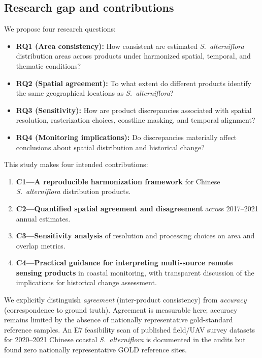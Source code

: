 \documentclass[11pt]{article}
\begin{document}
\subsection{Research gap and contributions}

We propose four research questions:

\begin{itemize}[nosep]
\item \textbf{RQ1 (Area consistency):} How consistent are estimated
  \textit{S.~alterniflora} distribution areas across products under harmonized
  spatial, temporal, and thematic conditions?
\item \textbf{RQ2 (Spatial agreement):} To what extent do different products
  identify the same geographical locations as \textit{S.~alterniflora}?
\item \textbf{RQ3 (Sensitivity):} How are product discrepancies associated with
  spatial resolution, rasterization choices, coastline masking, and temporal
  alignment?
\item \textbf{RQ4 (Monitoring implications):} Do discrepancies materially affect
  conclusions about spatial distribution and historical change?
\end{itemize}

This study makes four intended contributions:

\begin{enumerate}[nosep]
\item \textbf{C1---A reproducible harmonization framework} for Chinese
  \textit{S.~alterniflora} distribution products.
\item \textbf{C2---Quantified spatial agreement and disagreement} across
  2017--2021 annual estimates.
\item \textbf{C3---Sensitivity analysis} of resolution and processing choices on
  area and overlap metrics.
\item \textbf{C4---Practical guidance for interpreting multi-source remote
  sensing products} in coastal monitoring, with transparent discussion of the
  implications for historical change assessment.
\end{enumerate}

We explicitly distinguish \textit{agreement} (inter-product consistency) from
\textit{accuracy} (correspondence to ground truth). Agreement is measurable here;
accuracy remains limited by the absence of nationally representative gold-standard
reference samples. An E7 feasibility scan of published field/UAV survey datasets
for 2020--2021 Chinese coastal \textit{S.~alterniflora} is documented in the
audits but found zero nationally representative GOLD reference sites.
\end{document}
